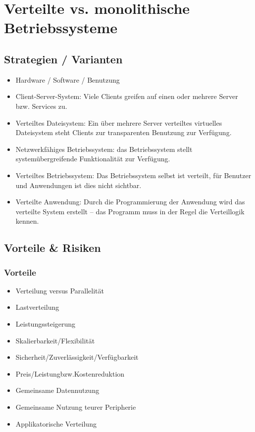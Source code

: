 \documentclass[a4paper, 10pt]{article}
\begin{document}
\newpage
\section{Verteilte vs. monolithische Betriebssysteme}
\subsection{Strategien / Varianten}
\begin{itemize}
	\item Hardware / Software / Benutzung
	\item Client-Server-System: Viele Clients greifen auf einen oder mehrere Server bzw. Services zu.
	\item Verteiltes Dateisystem: Ein über mehrere Server verteiltes virtuelles Dateisystem steht Clients zur transparenten Benutzung zur Verfügung.
	\item Netzwerkfähiges Betriebssystem: das Betriebssystem stellt systemübergreifende Funktionalität zur Verfügung.
	\item Verteiltes Betriebssystem: Das Betriebssystem selbst ist verteilt, für Benutzer und Anwendungen ist dies nicht sichtbar.
	\item Verteilte Anwendung: Durch die Programmierung der Anwendung wird das verteilte System erstellt – das Programm muss in der Regel die Verteillogik kennen.
\end{itemize}

\subsection{Vorteile \& Risiken}

\subsubsection{Vorteile}
\begin{itemize}
	\item Verteilung versus Parallelität
	\item Lastverteilung
	\item Leistungssteigerung
	\item Skalierbarkeit/Flexibilität
	\item Sicherheit/Zuverlässigkeit/Verfügbarkeit
	\item Preis/Leistungbzw.Kostenreduktion
	\item Gemeinsame Datennutzung
	\item Gemeinsame Nutzung teurer Peripherie
	\item Applikatorische Verteilung
\end{itemize}
\end{document}
